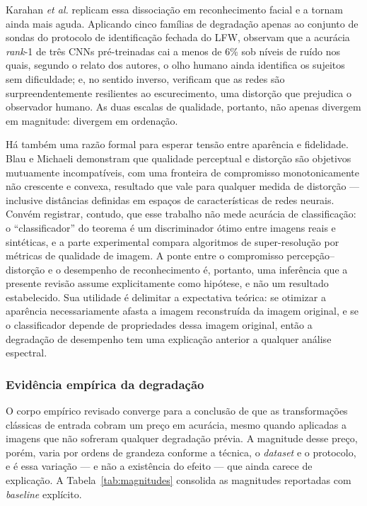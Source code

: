 \documentclass[conference]{IEEEtran}
\begin{document}
Karahan \textit{et al.} \cite{b2} replicam essa dissociação em reconhecimento
facial e a tornam ainda mais aguda. Aplicando cinco famílias de degradação
apenas ao conjunto de sondas do protocolo de identificação fechada do LFW,
observam que a acurácia \textit{rank}-1 de três CNNs pré-treinadas cai a menos
de 6\% sob níveis de ruído nos quais, segundo o relato dos autores, o olho
humano ainda identifica os sujeitos sem dificuldade; e, no sentido inverso,
verificam que as redes são surpreendentemente resilientes ao escurecimento, uma
distorção que prejudica o observador humano. As duas escalas de qualidade,
portanto, não apenas divergem em magnitude: divergem em ordenação.

Há também uma razão formal para esperar tensão entre aparência e fidelidade.
Blau e Michaeli \cite{b3} demonstram que qualidade perceptual e distorção são
objetivos mutuamente incompatíveis, com uma fronteira de compromisso
monotonicamente não crescente e convexa, resultado que vale para qualquer
medida de distorção --- inclusive distâncias definidas em espaços de
características de redes neurais. Convém registrar, contudo, que esse trabalho
não mede acurácia de classificação: o ``classificador'' do teorema é um
discriminador ótimo entre imagens reais e sintéticas, e a parte experimental
compara algoritmos de super-resolução por métricas de qualidade de imagem. A
ponte entre o compromisso percepção--distorção e o desempenho de reconhecimento
é, portanto, uma inferência que a presente revisão assume explicitamente como
hipótese, e não um resultado estabelecido. Sua utilidade é delimitar a
expectativa teórica: se otimizar a aparência necessariamente afasta a imagem
reconstruída da imagem original, e se o classificador depende de propriedades
dessa imagem original, então a degradação de desempenho tem uma explicação
anterior a qualquer análise espectral.

\subsubsection{Evidência empírica da degradação}

O corpo empírico revisado converge para a conclusão de que as transformações
clássicas de entrada cobram um preço em acurácia, mesmo quando aplicadas a
imagens que não sofreram qualquer degradação prévia. A magnitude desse preço,
porém, varia por ordens de grandeza conforme a técnica, o \textit{dataset} e o
protocolo, e é essa variação --- e não a existência do efeito --- que ainda
carece de explicação. A Tabela~\ref{tab:magnitudes} consolida as magnitudes
reportadas com \textit{baseline} explícito.
\end{document}
